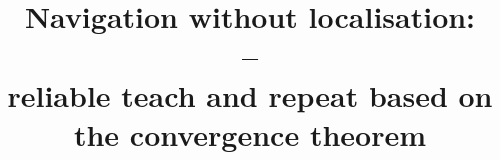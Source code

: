\newcommand{\Subject}{\LARGE \bf Navigation without localisation:\\--\\ reliable teach and repeat based on the convergence theorem}
\newcommand{\Meeting}{IROS'18 Presentation on exposure and detector setting experiments' outcomes}
\newcommand{\Authors}{Tom{\' a}{\v s} Krajn{\'i}k, Filip Majer, Lucie Halodov{\' a}, Tom{\' a}{\v s} Vintr}
\newcommand{\Author}{Tom Krajnik}
\newcommand{\Date}{October 2018}

\newcommand{\video}[2]{\href{run:#1}{\texttt{[image: \#2]}}}
\newcommand{\bib}[3]{\begin{thebibliography}{#1}\bibitem[#1]{#1}{#2}.\newblock{\em #3}\end{thebibliography}}

\newcommand{\Lincoln}{Artificial Intelligence Centre, Czech Technical University, Czechia}
\newcommand{\Institute}{\Lincoln\\}

\newcommand{\HeadLineLeft}{Krajn{\' i}k et al.}
\newcommand{\HeadLineCenter}{Navigation without localisation: reliable teach and repeat based on the convergence theorem}
\newcommand{\HeadLineRight}{Madrid, IROS 2018}
\newcommand{\FootLineCenter}{Navigation without localisation: reliable teach and repeat based on the convergence theorem}
\newcommand{\FootLineLeft}{\insertshortauthor}




\title{{\bf \Subject}}
\usepackage{multirow}


\frame{\titlepage}

